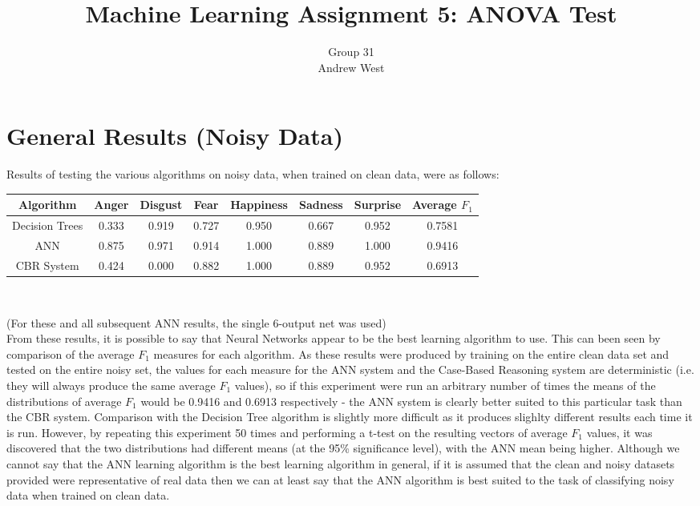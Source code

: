 \documentclass[a4paper]{article}
\title{Machine Learning Assignment 5: ANOVA Test}
\author{Group 31 \\ Andrew West}
\begin{document}
\maketitle

\section{General Results (Noisy Data)}

Results of testing the various algorithms on noisy data, when trained on clean data, were as follows:\\

\begin{center}
  \begin{tabular}{c|cccccc|c}
    Algorithm & Anger & Disgust & Fear & Happiness & Sadness & Surprise & Average $F_1$\\
    \hline
    Decision Trees 	& 0.333 & 0.919 & 0.727 & 0.950 & 0.667 & 0.952 & 0.7581 \\
	ANN 			& 0.875 & 0.971 & 0.914 & 1.000	& 0.889 & 1.000 & 0.9416 \\
	CBR System 		& 0.424 & 0.000 & 0.882 & 1.000	& 0.889 & 0.952 & 0.6913 \\
  \end{tabular}\\
  \end{center}
  (For these and all subsequent ANN results, the single 6-output net was used)\\
  
From these results, it is possible to say that Neural Networks appear to be the best learning algorithm to use. This can
been seen by comparison of the average $F_1$ measures for each algorithm. As these results were produced by training on
the entire clean data set and tested on the entire noisy set, the values for each measure for the ANN system and the
Case-Based Reasoning system are deterministic (i.e. they will always produce the same average $F_1$ values), so if this
experiment were run an arbitrary number of times the means of the distributions of average $F_1$ would be 0.9416 and
0.6913 respectively - the ANN system is clearly better suited to this particular task than the CBR system. Comparison
with the Decision Tree algorithm is slightly more difficult as it produces slighlty different results each time it is run.
However, by repeating this experiment 50 times and performing a t-test on the resulting vectors of average $F_1$ values,
it was discovered that the two distributions had different means (at the 95\% significance level), with the ANN mean being
higher. Although we cannot say that the ANN learning algorithm is the best learning algorithm in general, if it is assumed
that the clean and noisy datasets provided were representative of real data then we can at least say that the ANN algorithm
is best suited to the task of classifying noisy data when trained on clean data.\\
\end{document}
